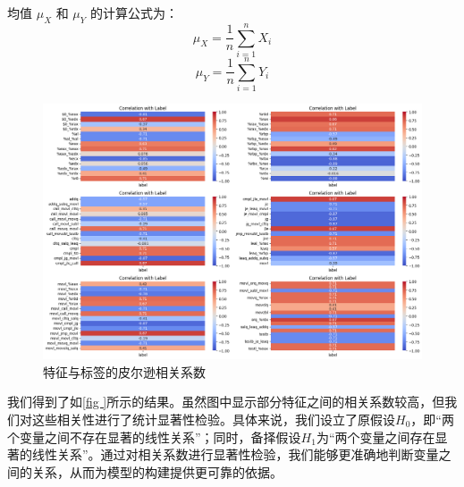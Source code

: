 均值 \(\mu_X\) 和 \(\mu_Y\) 的计算公式为：
\begin{equation}
	\mu_X = \frac{1}{n} \sum_{i=1}^{n} X_i
	\label{eq:mean_x}
\end{equation}
\begin{equation}
	\mu_Y = \frac{1}{n} \sum_{i=1}^{n} Y_i
	\label{eq:mean_y}
\end{equation}

\begin{figure}[H]
	\centering
	\includegraphics[width=1\linewidth]{figures/corr.png}
	\caption{特征与标签的皮尔逊相关系数}
	\label{fig:corr}
\end{figure}
我们得到了如\autoref{fig
}所示的结果。虽然图中显示部分特征之间的相关系数较高，但我们对这些相关性进行了统计显著性检验。具体来说，我们设立了原假设$H_0$，即“两个变量之间不存在显著的线性关系”；同时，备择假设$H_1$为“两个变量之间存在显著的线性关系”。通过对相关系数进行显著性检验，我们能够更准确地判断变量之间的关系，从而为模型的构建提供更可靠的依据。

